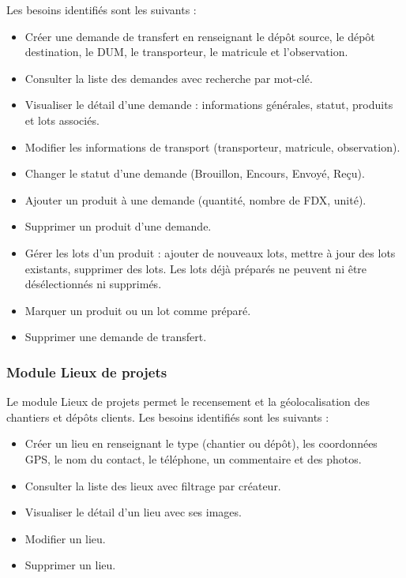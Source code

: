 \documentclass[12pt,a4paper]{article}
\begin{document}
    Les besoins identifiés sont les suivants :
    \begin{itemize}[leftmargin=1.2em]
    \item Créer une demande de transfert en renseignant le dépôt source, le dépôt destination, le DUM, le transporteur, le matricule et l'observation.
    \item Consulter la liste des demandes avec recherche par mot-clé.
    \item Visualiser le détail d'une demande : informations générales, statut, produits et lots associés.
    \item Modifier les informations de transport (transporteur, matricule, observation).
    \item Changer le statut d'une demande (Brouillon, Encours, Envoyé, Reçu).
    \item Ajouter un produit à une demande (quantité, nombre de FDX, unité).
    \item Supprimer un produit d'une demande.
    \item Gérer les lots d'un produit : ajouter de nouveaux lots, mettre à jour des lots existants, supprimer des lots. Les lots déjà préparés ne peuvent ni être désélectionnés ni supprimés.
    \item Marquer un produit ou un lot comme préparé.
    \item Supprimer une demande de transfert.
    \end{itemize}

    \subsubsection{Module Lieux de projets}
    Le module Lieux de projets permet le recensement et la géolocalisation des chantiers et dépôts clients. Les besoins identifiés sont les suivants :
    \begin{itemize}[leftmargin=1.2em]
    \item Créer un lieu en renseignant le type (chantier ou dépôt), les coordonnées GPS, le nom du contact, le téléphone, un commentaire et des photos.
    \item Consulter la liste des lieux avec filtrage par créateur.
    \item Visualiser le détail d'un lieu avec ses images.
    \item Modifier un lieu.
    \item Supprimer un lieu.
    \end{itemize}
\end{document}
